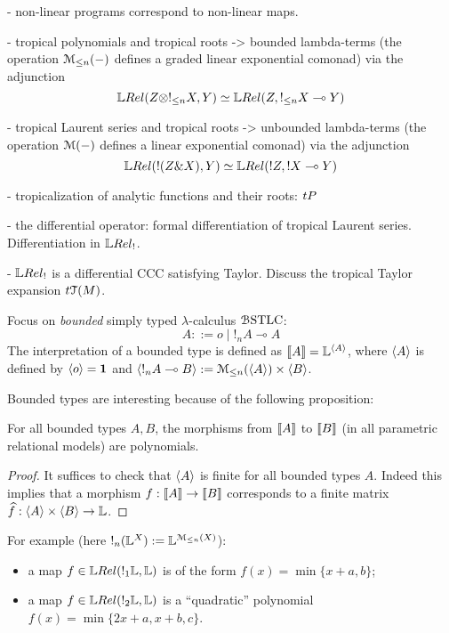 

- non-linear programs correspond to non-linear maps.




- tropical polynomials and tropical roots -> bounded lambda-terms
(the operation $\mathcal{M}_{\leq n}(-)$ defines a graded linear exponential comonad) via the adjunction
$$
\LREL(Z\otimes !_{\leq n}X,Y) \simeq \LREL(Z, !_{\leq n}X\multimap Y) 
$$

- tropical Laurent series and tropical roots -> unbounded lambda-terms (the operation $\mathcal{M}(-)$ defines a linear exponential comonad) via the adjunction
$$
\LREL(!(Z\& X),Y) \simeq \LREL(!Z, !X\multimap Y) 
$$


- tropicalization of analytic functions and their roots: 
$\trop P$ 



- the differential operator: formal differentiation of tropical Laurent series. Differentiation in $\LREL_{!}$.



- $\LREL_{!}$ is a differential CCC satisfying Taylor. 
Discuss the tropical Taylor expansion $\trop\C T(M)$. 




Focus on \emph{bounded} simply typed $\lambda$-calculus $\mathcal{B}\mathrm{STLC}$:
$$
A::= o \mid !_{n}A \multimap A
$$
The interpretation of a bounded type is defined as 
$\llbracket A\rrbracket= \mathbb{L}^{\langle A\rangle}$, where 
$\langle A\rangle$ is defined by $\langle o\rangle=\mathbf{1}$ and 
$\langle !_{n}A\multimap B\rangle:= \mathcal{M}_{\leq n}(\langle A\rangle) \times \langle B\rangle$.

Bounded types are interesting
because of the following proposition:
\begin{proposition}
For all bounded types $A,B$, the morphisms from $\llbracket A\rrbracket$ to $\llbracket B\rrbracket$ (in all parametric relational models) are polynomials.


\end{proposition}
\begin{proof}
It suffices to check that $\langle A\rangle$ is finite for all bounded types $A$. Indeed this implies that a morphism $f:\llbracket A\rrbracket\to \llbracket B\rrbracket$ corresponds to a finite matrix $\widehat f: \langle A\rangle \times \langle B\rangle \to \mathbb{L}$.
\end{proof}

For example (here $!_{n}(\mathbb{L}^{X}):= \mathbb{L}^{\mathcal{M}_{\leq n}(X)}$):
\begin{itemize}
\item a map $f\in \LREL( !_{1}\Lawv, \Lawv)$ is of the form $f(x)=\min \{x+a,b\}$;

\item a map $f\in \LREL(!_{2}\Lawv, \Lawv)$ is a ``quadratic'' polynomial $f(x)=\min\{2x+a, x+b, c\}$.



\end{itemize}




